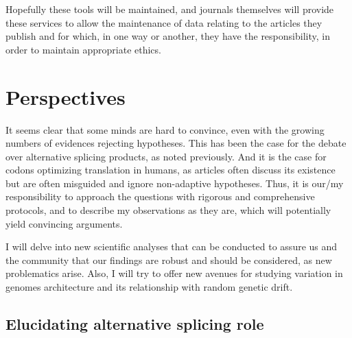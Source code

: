 Hopefully these tools will be maintained, and journals themselves will provide these services to allow the maintenance of data relating to the articles they publish and for which, in one way or another, they have the responsibility, in order to maintain appropriate ethics.


\section{Perspectives}

It seems clear that some minds are hard to convince, even with the growing numbers of evidences rejecting hypotheses. This has been the case for the debate over alternative splicing products, as noted previously. And it is the case for codons optimizing translation in humans, as articles often discuss its existence but are often misguided and ignore non-adaptive hypotheses. Thus, it is our/my responsibility to approach the questions with rigorous and comprehensive protocols, and to describe my observations as they are, which will potentially yield convincing arguments.

I will delve into new scientific analyses that can be conducted to assure us and the community that our findings are robust and should be considered, as new problematics arise. Also, I will try to offer new avenues for studying variation in genomes architecture and its relationship with random  \gls{genetic drift}.

 
\subsection{Elucidating alternative splicing role}

